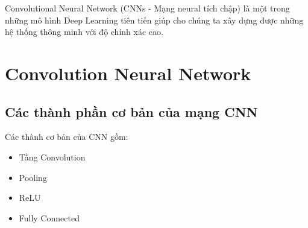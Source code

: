 Convolutional  Neural  Network  (CNNs - Mạng neural tích chập) là một trong những mô hình Deep Learning tiên tiến giúp cho chúng ta xây dựng được những hệ thống thông minh với độ chính xác cao.
\section{Convolution Neural Network \cite{cnn}}

\subsection{Các thành phần cơ bản của mạng CNN}

Các thành cơ bản của CNN gồm:
\begin{itemize}
	\item Tầng Convolution
	\item Pooling
	\item ReLU
	\item Fully Connected
\end{itemize}
 

